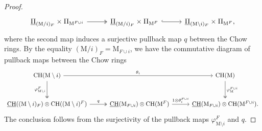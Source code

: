 \documentclass[11pt,reqno]{amsart}
\theoremstyle{definition}
\theoremstyle{remark}
\renewcommand{\(}{\left(}
\renewcommand{\)}{\right)}
\newcommand{\<}{\left<}
\renewcommand{\>}{\right>}
\begin{document}
\begin{proof}
\[
\begin{tikzcd}[column sep=10mm, row sep=10mm]
\underline{\Pi}_{(\mathrm{M}/i)_{F}}\times \Pi_{\mathrm{M}^{F\cup i}} \arrow[r,two heads] &
\underline{\Pi}_{(\mathrm{M}/i)_{F}}\times \Pi_{\mathrm{M}^{F}}  \arrow[r,hook]&
\underline{\Pi}_{(\mathrm{M}\setminus i)_{F}}\times \Pi_{\mathrm{M}^F},
\end{tikzcd}
\]
where the second map induces a surjective pullback map $q$ between the Chow rings. %
By the equality $(\mathrm{M}/i)_F = \mathrm{M}_{F \cup i}$, we have the commutative diagram of pullback maps between the Chow rings
\[
\begin{tikzcd}[column sep=10mm, row sep=10mm]
\mathrm{CH}(\mathrm{M}\setminus i) \arrow[rr, "\theta_i"] \arrow[d,two heads, "\varphi^F_{\mathrm{M} \setminus i}"']&& \mathrm{CH}(\mathrm{M})  \arrow[d,two heads, "\varphi^{F \cup i}_\mathrm{M}"]\\
\underline{\mathrm{CH}}((\mathrm{M}\setminus i)_F)\otimes \mathrm{CH}((\mathrm{M} \setminus i)^F) \arrow[r,two heads, "q"]&%
\underline{\mathrm{CH}}(\mathrm{M}_{F\cup i})\otimes \mathrm{CH}(\mathrm{M}^F) \arrow[r,"1 \otimes \theta^{F \cup i}_i"]%
& \underline{\mathrm{CH}}(\mathrm{M}_{F\cup i})\otimes \mathrm{CH}(\mathrm{M}^{F\cup i}).
\end{tikzcd}
\]
The conclusion follows from the surjectivity of the pullback maps $\varphi^F_{\mathrm{M} \setminus i}$ and $q$.

\end{proof}
\end{document}
